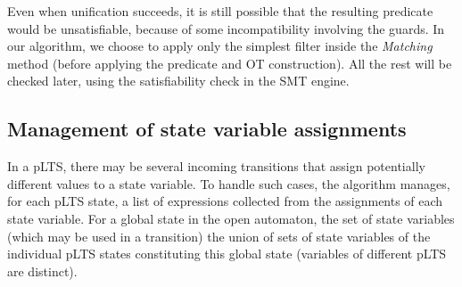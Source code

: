 \documentclass{lncs/llncs}
\newcommand{\QIN}[1]{\textcolor{airforceblue}{#1}}
\begin{document}
Even when unification succeeds, it is still possible that
the resulting predicate would be unsatisfiable, because of some
incompatibility involving the guards. In our algorithm, we choose to
apply only the simplest filter inside the \emph{Matching} method
(before applying the predicate and OT construction). All
the rest will be checked later, using the satisfiability check in the
SMT engine.


\subsection{Management of state variable assignments}


In a pLTS, there may be several incoming transitions 
that assign potentially different values to a state variable.
To handle such cases, the algorithm manages, for each pLTS state, a
list of expressions collected from the assignments of each state
variable. %
For a global state in the open automaton, the set of state
variables (which may be used in a transition) %
the union
of sets of state variables of the individual pLTS states constituting this
global state (variables of different pLTS are distinct).


\end{document}
